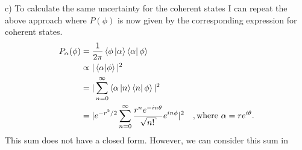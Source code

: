 \begin{homeworkProblem}[Problem 9]
\begin{homeworkSection}{c)}
      To calculate the same uncertainty for the coherent states I can repeat the
      above approach where $ P(\phi) $ is now given by the corresponding expression
      for coherent states.
      \begin{align}
         P_{\alpha}(\phi) &= \frac{1}{2 \pi} \braket{\phi \ket{\alpha} \bra{\alpha}
         \phi} \\
         & \propto | \braket{\alpha | \phi} |^2 \\
         &= | \sum^{\infty}_{n=0}  \braket{\alpha \ket{n} \bra{n} \phi} |^2 \\
         &= | e^{{-r^{2}}/2} \sum^{\infty}_{n=0}
         \frac{r^{n}e^{-i n \theta}}{\sqrt{n!}} e^{i n \phi}|^2
         \quad,\text{where $ \alpha = r e^{i \theta} $.} \\
      \end{align}
      This sum does not have a closed form. However, we can consider this sum in

\end{homeworkSection}
\end{homeworkProblem}
